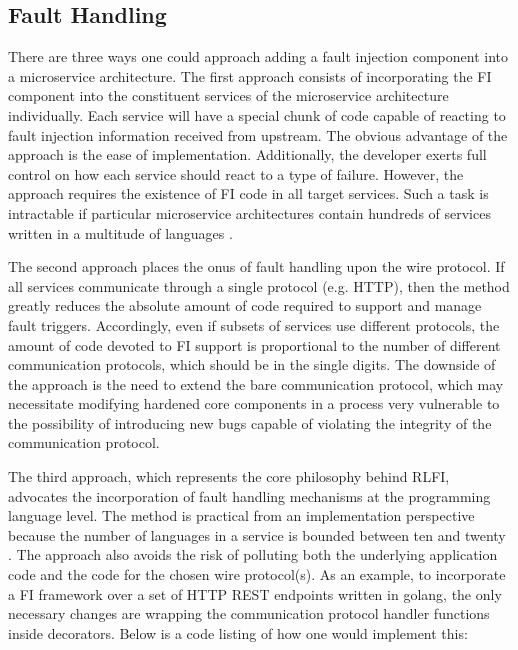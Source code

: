 \subsection{Fault Handling}
There are three ways one could approach adding a fault injection component into a microservice architecture. The first approach consists of incorporating the FI component into the constituent services of the microservice architecture individually. Each service will have a special chunk of code capable of reacting to fault injection information received from upstream.  The obvious advantage of the approach is the ease of implementation. Additionally, the developer exerts full control on how each service should react to a type of failure. However, the approach requires the existence of FI code in all target services. Such a task is intractable if particular microservice architectures contain hundreds of services written in a multitude of languages .

The second approach places the onus of fault handling upon the wire protocol. If all services communicate through a single protocol (e.g. HTTP), then the method greatly reduces the absolute amount of code required to support and manage fault triggers. Accordingly, even if subsets of services use different protocols, the amount of code devoted to FI support is proportional to the number of different communication protocols, which should be in the single digits. The downside of the approach is the need to extend the bare communication protocol, which may necessitate modifying hardened core components in a process very vulnerable to the possibility of introducing new bugs capable of violating the integrity of the communication protocol.

The third approach, which represents the core philosophy behind RLFI, advocates the incorporation of fault handling mechanisms at the programming language level.  The method is practical from an implementation perspective because the number of languages in a service is bounded between ten and twenty . The approach also avoids the risk of polluting both the underlying application code and the code for the chosen wire protocol(s). As an example, to incorporate a FI framework over a set of HTTP REST endpoints written in golang\cite{google:golang}, the only necessary changes are wrapping the communication protocol handler functions inside decorators. Below is a code listing of how one would implement this: 


